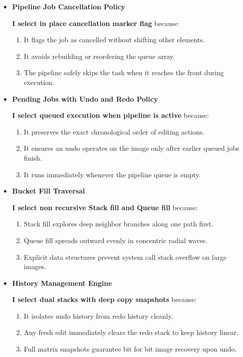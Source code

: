 \documentclass[9.5pt,a4paper]{article}
\begin{document}
\begin{itemize}[noitemsep,topsep=1pt,parsep=3pt,partopsep=0pt]
    \item \textbf{Pipeline Job Cancellation Policy}
    
    \textbf{I select in place cancellation marker flag} because:
    \begin{enumerate}[noitemsep,topsep=1pt,parsep=1pt]
        \item It flags the job as cancelled without shifting other elements.
        \item It avoids rebuilding or reordering the queue array.
        \item The pipeline safely skips the task when it reaches the front during execution.
    \end{enumerate}

    \item \textbf{Pending Jobs with Undo and Redo Policy}
    
    \textbf{I select queued execution when pipeline is active} because:
    \begin{enumerate}[noitemsep,topsep=1pt,parsep=1pt]
        \item It preserves the exact chronological order of editing actions.
        \item It ensures an undo operates on the image only after earlier queued jobs finish.
        \item It runs immediately whenever the pipeline queue is empty.
    \end{enumerate}

    \item \textbf{Bucket Fill Traversal}
    
    \textbf{I select non recursive Stack fill and Queue fill} because:
    \begin{enumerate}[noitemsep,topsep=1pt,parsep=1pt]
        \item Stack fill explores deep neighbor branches along one path first.
        \item Queue fill spreads outward evenly in concentric radial waves.
        \item Explicit data structures prevent system call stack overflow on large images.
    \end{enumerate}

    \item \textbf{History Management Engine}
    
    \textbf{I select dual stacks with deep copy snapshots} because:
    \begin{enumerate}[noitemsep,topsep=1pt,parsep=1pt]
        \item It isolates undo history from redo history cleanly.
        \item Any fresh edit immediately clears the redo stack to keep history linear.
        \item Full matrix snapshots guarantee bit for bit image recovery upon undo.
    \end{enumerate}
\end{itemize}
\end{document}
